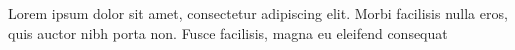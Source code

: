 \begin{ringraziamenti} 
Lorem ipsum dolor sit amet, consectetur adipiscing elit. Morbi facilisis nulla eros, quis auctor nibh porta non. Fusce facilisis, magna eu eleifend consequat
\end{ringraziamenti}